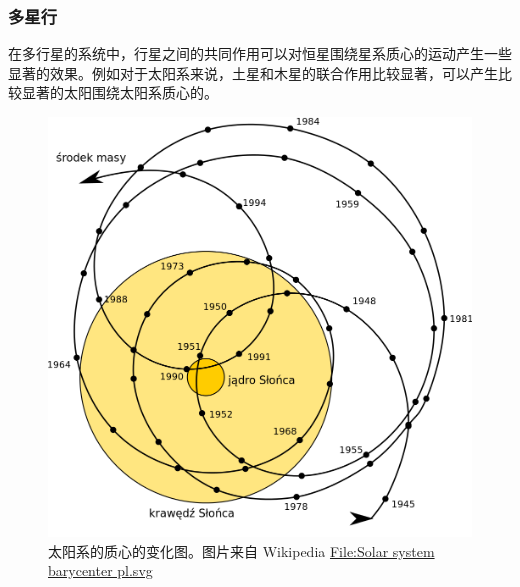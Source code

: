 \documentclass[letterpaper,10pt,english]{sphinxmanual}
\begin{document}
\subsubsection{多星行}
\label{orbits:id14}
在多行星的系统中，行星之间的共同作用可以对恒星围绕星系质心的运动产生一些显著的效果。例如对于太阳系来说，土星和木星的联合作用比较显著，可以产生比较显著的太阳围绕太阳系质心的。
\begin{figure}[htbp]
\centering
\capstart

\includegraphics{Solar_system_barycenter_pl.png}
\caption{太阳系的质心的变化图。图片来自 Wikipedia \href{http://commons.wikimedia.org/wiki/File:Solar\_system\_barycenter\_pl.svg}{File:Solar system barycenter pl.svg}}\end{figure}
\end{document}
